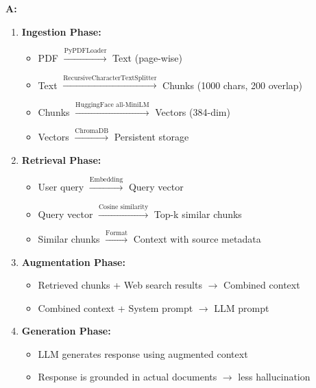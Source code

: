 \documentclass[12pt, a4paper]{article}
\begin{document}
\begin{interviewbox}[title={\faIcon{user-tie} ~Q21: RAG pipeline step-by-step explain karo.}]
\textbf{A:}
\begin{enumerate}
\item \textbf{Ingestion Phase:}
    \begin{itemize}
    \item PDF $\xrightarrow{\text{PyPDFLoader}}$ Text (page-wise)
    \item Text $\xrightarrow{\text{RecursiveCharacterTextSplitter}}$ Chunks (1000 chars, 200 overlap)
    \item Chunks $\xrightarrow{\text{HuggingFace all-MiniLM}}$ Vectors (384-dim)
    \item Vectors $\xrightarrow{\text{ChromaDB}}$ Persistent storage
    \end{itemize}

\item \textbf{Retrieval Phase:}
    \begin{itemize}
    \item User query $\xrightarrow{\text{Embedding}}$ Query vector
    \item Query vector $\xrightarrow{\text{Cosine similarity}}$ Top-k similar chunks
    \item Similar chunks $\xrightarrow{\text{Format}}$ Context with source metadata
    \end{itemize}

\item \textbf{Augmentation Phase:}
    \begin{itemize}
    \item Retrieved chunks + Web search results $\rightarrow$ Combined context
    \item Combined context + System prompt $\rightarrow$ LLM prompt
    \end{itemize}

\item \textbf{Generation Phase:}
    \begin{itemize}
    \item LLM generates response using augmented context
    \item Response is grounded in actual documents $\rightarrow$ less hallucination
    \end{itemize}
\end{enumerate}
\end{interviewbox}
\end{document}
